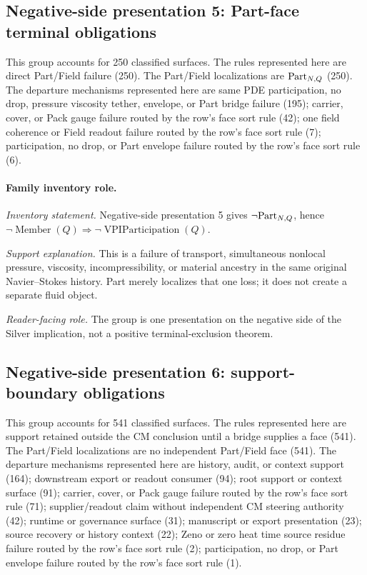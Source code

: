 \subsection{Negative-side presentation 5: Part-face terminal obligations}
This group accounts for 250 classified surfaces. The rules represented here are direct Part/Field failure (250). The Part/Field localizations are \(\mathrm{Part}_{N,Q}\) (250). The departure mechanisms represented here are same PDE participation, no drop, pressure viscosity tether, envelope, or Part bridge failure (195); carrier, cover, or Pack gauge failure routed by the row's face sort rule (42); one field coherence or Field readout failure routed by the row's face sort rule (7); participation, no drop, or Part envelope failure routed by the row's face sort rule (6).

\paragraph{Family inventory role.}
\emph{Inventory statement.} Negative-side presentation 5 gives \(\neg\mathrm{Part}_{N,Q}\), hence \(\neg\operatorname{Member}(Q)\Rightarrow\neg\operatorname{VPIParticipation}(Q)\).

\emph{Support explanation.} This is a failure of transport, simultaneous nonlocal pressure, viscosity, incompressibility, or material ancestry in the same original Navier--Stokes history. Part merely localizes that one loss; it does not create a separate fluid object.

\emph{Reader-facing role.} The group is one presentation on the negative side of the Silver implication, not a positive terminal-exclusion theorem.

\subsection{Negative-side presentation 6: support-boundary obligations}
This group accounts for 541 classified surfaces. The rules represented here are support retained outside the CM conclusion until a bridge supplies a face (541). The Part/Field localizations are no independent Part/Field face (541). The departure mechanisms represented here are history, audit, or context support (164); downstream export or readout consumer (94); root support or context surface (91); carrier, cover, or Pack gauge failure routed by the row's face sort rule (71); supplier/readout claim without independent CM steering authority (42); runtime or governance surface (31); manuscript or export presentation (23); source recovery or history context (22); Zeno or zero heat time source residue failure routed by the row's face sort rule (2); participation, no drop, or Part envelope failure routed by the row's face sort rule (1).

